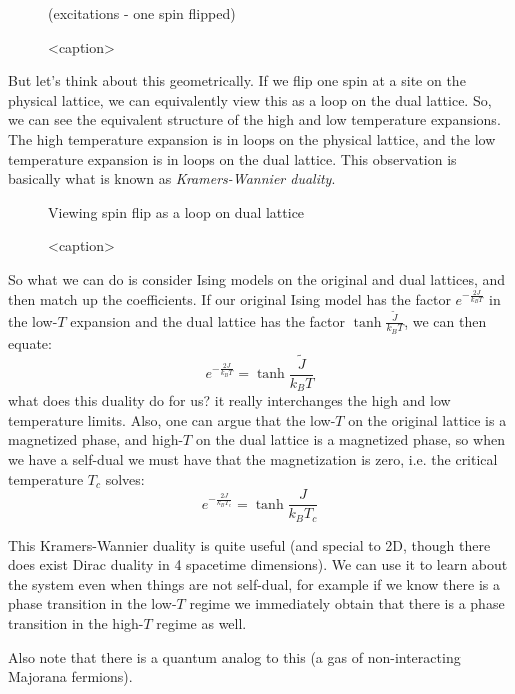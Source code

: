 \begin{figure}[htbp]
    \centering
    (excitations - one spin flipped)
    \caption{<caption>}
    \label{<label>}
\end{figure}
But let's think about this geometrically. If we flip one spin at a site on the physical lattice, we can equivalently view this as a loop on the dual lattice. So, we can see the equivalent structure of the high and low temperature expansions. The high temperature expansion is in loops on the physical lattice, and the low temperature expansion is in loops on the dual lattice. This observation is basically what is known as \emph{Kramers-Wannier duality}.

\begin{figure}[htbp]
    \centering
    Viewing spin flip as a loop on dual lattice
    \caption{<caption>}
    \label{<label>}
\end{figure}

So what we can do is consider Ising models on the original and dual lattices, and then match up the coefficients. If our original Ising model has the factor $e^{-\frac{2J}{k_B T}}$ in the low-$T$ expansion and the dual lattice has the factor $\tanh\frac{\tilde{J}}{k_B T}$, we can then equate:
\begin{equation}
    e^{-\frac{2J}{k_B T}} = \tanh\frac{\tilde{J}}{k_B T}
\end{equation}
what does this duality do for us? it really interchanges the high and low temperature limits. Also, one can argue that the low-$T$ on the original lattice is a magnetized phase, and high-$T$ on the dual lattice is a magnetized phase, so when we have a self-dual we must have that the magnetization is zero, i.e. the critical temperature $T_c$ solves:
\begin{equation}
    e^{-\frac{2J}{k_B T_c}} = \tanh\frac{J}{k_B T_c}
\end{equation}

This Kramers-Wannier duality is quite useful (and special to 2D, though there does exist Dirac duality in 4 spacetime dimensions). We can use it to learn about the system even when things are not self-dual, for example if we know there is a phase transition in the low-$T$ regime we immediately obtain that there is a phase transition in the high-$T$ regime as well.

Also note that there is a quantum analog to this (a gas of non-interacting Majorana fermions).


